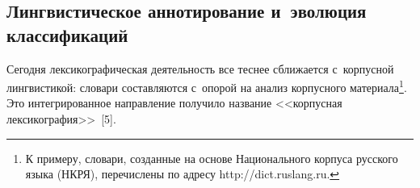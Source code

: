 \begin{multicols}{2}
\vspace*{-9pt}
  
\section{Лингвистическое аннотирование и~эволюция 
классификаций}

\vspace*{-2pt}

  Сегодня лексикографическая деятельность все теснее сближается 
  с~корпусной лингвистикой: словари составляются с~опорой на анализ 
корпусного материала\footnote[5]{К примеру, словари, созданные на основе Национального 
корпуса русского языка (НКРЯ), перечислены по адресу {\sf http://dict.ruslang.ru}.}. Это 
интегрированное направление получило название <<корпусная 
лексикография>>~[5].

\pagebreak

\end{multicols}

